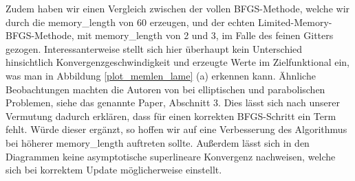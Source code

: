 Zudem haben wir einen Vergleich zwischen der vollen BFGS-Methode, welche wir durch die \textsf{memory\_length} von 60 erzeugen, und der echten Limited-Memory-BFGS-Methode, mit \textsf{memory\_length} von 2 und 3, im Falle des feinen Gitters gezogen. Interessanterweise stellt sich hier überhaupt kein Unterschied hinsichtlich Konvergenzgeschwindigkeit und erzeugte Werte im Zielfunktional ein, was man in Abbildung \ref{plot_memlen_lame} (a) erkennen kann. Ähnliche Beobachtungen machten die Autoren von \cite{diffusion} bei elliptischen und parabolischen Problemen, siehe das genannte Paper, Abschnitt 3. Dies lässt sich nach unserer Vermutung dadurch erklären, dass für einen korrekten BFGS-Schritt ein Term fehlt. Würde dieser ergänzt, so hoffen wir auf eine Verbesserung des Algorithmus bei höherer \textsf{memory\_length} auftreten sollte. Außerdem lässt sich in den Diagrammen keine asymptotische superlineare Konvergenz nachweisen, welche sich bei korrektem Update möglicherweise einstellt.

